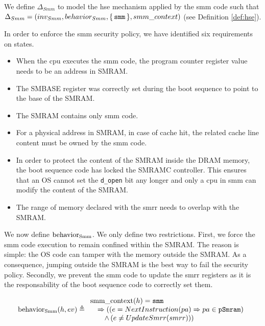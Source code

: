 We define $\Delta_{Smm}$ to model the \ac{hse} mechanism applied by the \ac{smm}
code such that
$\Delta_{Smm} = (inv_{Smm}, behavior_{Smm}, \{\,\mathtt{smm}\,\},
smm\_context)$ (see Definition \ref{def:hse}).

In order to enforce the \ac{smm} security policy, we have identified six
requirements on states.
\begin{itemize}
\item When the \ac{cpu} executes the \ac{smm} code, the program counter register
  value needs to be an address in SMRAM.
\item The SMBASE register was correctly set during the boot sequence to point to
  the base of the SMRAM.
\item The SMRAM contains only \ac{smm} code.
\item For a physical address in SMRAM, in case of cache hit, the related cache
  line content must be owned by the \ac{smm} code.
\item In order to protect the content of the SMRAM inside the DRAM memory, the
  boot sequence code has locked the SMRAMC controller. This ensures that an OS
  cannot set the \texttt{d\_open} bit any longer and only a \ac{cpu} in \ac{smm}
  can modify the content of the SMRAM.
\item The range of memory declared with the \ac{smrr} needs to overlap with the
  SMRAM.
\end{itemize}


We now define $\mathrm{behavior_{Smm}}$.
%
We only define two restrictions.
%
First, we force the \ac{smm} code execution to remain confined within the SMRAM.
%
The reason is simple: the OS code can tamper with the memory outside the SMRAM.
%
As a consequence, jumping outside the SMRAM is the best way to fail the security
policy.
%
Secondly, we prevent the \ac{smm} code to update the \ac{smrr} registers as it
is the responsability of the boot sequence code to correctly set them.

\[
  \mathrm{behavior_{Smm}}(h, ev) \triangleq
  \begin{array}{l}
    \mathrm{smm\_context}(h) = \mathtt{smm} \\
    \quad \Rightarrow ((e =
    NextInstruction(pa)
    \Rightarrow pa \in \texttt{pSmram}) \\
    \qquad \wedge\,(e \neq UpdateSmrr(smrr))) \\
  \end{array}
\]

